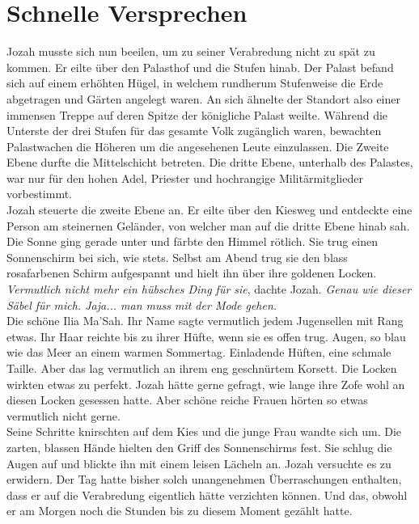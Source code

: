 \chapter{Schnelle Versprechen}

Jozah musste sich nun beeilen, um zu seiner Verabredung nicht zu spät zu kommen. Er eilte über den 
Palasthof und die Stufen hinab. Der Palast befand sich auf einem erhöhten Hügel, in welchem 
rundherum Stufenweise die Erde abgetragen und Gärten angelegt waren. An sich ähnelte der Standort 
also einer immensen Treppe auf deren Spitze der königliche Palast weilte. Während die Unterste der 
drei Stufen für das gesamte Volk zugänglich waren, bewachten Palastwachen die Höheren um die 
angesehenen Leute einzulassen. Die Zweite Ebene durfte die Mittelschicht betreten. Die dritte Ebene, 
unterhalb des Palastes, war nur für den hohen Adel, Priester und hochrangige Militärmitglieder 
vorbestimmt. \\
Jozah steuerte die zweite Ebene an. Er eilte über den Kiesweg und entdeckte eine Person am 
steinernen Geländer, von welcher man auf die dritte Ebene hinab sah. Die Sonne ging gerade unter und 
färbte den Himmel rötlich. Sie trug einen Sonnenschirm bei sich, wie stets. Selbst am Abend trug sie 
den blass rosafarbenen Schirm aufgespannt und hielt ihn über ihre goldenen Locken. \\
\textit{Vermutlich nicht mehr ein hübsches Ding für sie}, dachte Jozah. \textit{Genau wie dieser 
Säbel für mich. Jaja... man muss mit der Mode gehen.}\\
Die schöne Ilia Ma'Sah. Ihr Name sagte vermutlich jedem Jugensellen mit Rang etwas. Ihr Haar reichte 
bis zu ihrer Hüfte, wenn sie es offen trug. Augen, so blau wie das Meer an einem warmen Sommertag. 
Einladende Hüften, eine schmale Taille. Aber das lag vermutlich an ihrem eng geschnürtem Korsett. 
Die Locken wirkten etwas zu perfekt. Jozah hätte gerne gefragt, wie lange ihre Zofe wohl an diesen 
Locken gesessen hatte. Aber schöne reiche Frauen hörten so etwas vermutlich nicht gerne.\\
Seine Schritte knirschten auf dem Kies und die junge Frau wandte sich um. Die zarten, blassen Hände 
hielten den Griff des Sonnenschirms fest. Sie schlug die Augen auf und blickte ihn mit einem leisen 
Lächeln an. Jozah versuchte es zu erwidern. Der Tag hatte bisher solch unangenehmen Überraschungen 
enthalten, dass er auf die Verabredung eigentlich hätte verzichten können. Und das, obwohl er am 
Morgen noch die Stunden bis zu diesem Moment gezählt hatte. \\
